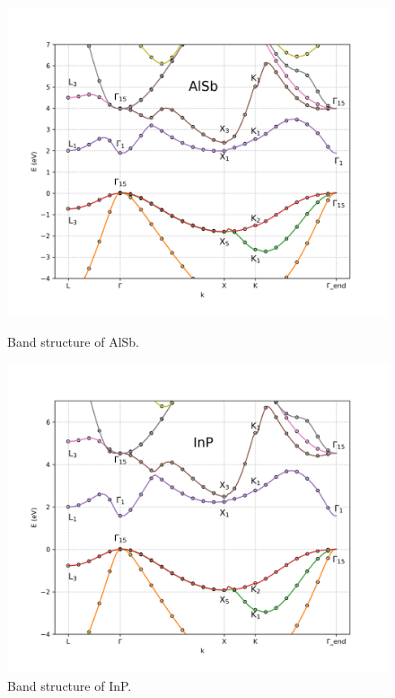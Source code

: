 \documentclass[twocolumn]{article}[h]
\begin{document}
\begin{figure}[htb]
    \centering
    \includegraphics[width=\linewidth]{AlSb.png}
    \vspace{-1cm}
    \caption{Band structure of AlSb.}
    \label{fig:AlSb}

    \centering
    \includegraphics[width=\linewidth]{InP.png}
    \vspace{-1cm}

    \caption{Band structure of InP.}
    \label{fig:InP}


\end{figure}
\end{document}
